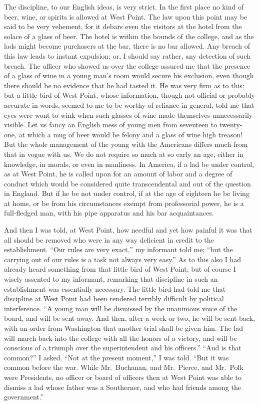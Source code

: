 The discipline, to our English ideas, is very strict.  In the first
place no kind of beer, wine, or spirits is allowed at West Point.
The law upon this point may be said to be very vehement, for it
debars even the visitors at the hotel from the solace of a glass of
beer.  The hotel is within the bounds of the college, and as the
lads might become purchasers at the bar, there is no bar allowed.
Any breach of this law leads to instant expulsion; or, I should say
rather, any detection of such breach.  The officer who showed us
over the college assured me that the presence of a glass of wine in
a young man's room would secure his exclusion, even though there
should be no evidence that he had tasted it.  He was very firm as
to this; but a little bird of West Point, whose information, though
not official or probably accurate in words, seemed to me to be
worthy of reliance in general, told me that eyes were wont to wink
when such glasses of wine made themselves unnecessarily visible.
Let us fancy an English mess of young men from seventeen to twenty-
one, at which a mug of beer would be felony and a glass of wine
high treason!  But the whole management of the young with the
Americans differs much from that in vogue with us.  We do not
require so much at so early an age, either in knowledge, in morals,
or even in manliness.  In America, if a lad be under control, as at
West Point, he is called upon for an amount of labor and a degree
of conduct which would be considered quite transcendental and out
of the question in England.  But if he be not under control, if at
the age of eighteen he be living at home, or be from his
circumstances exempt from professorial power, he is a full-fledged
man, with his pipe apparatus and his bar acquaintances.

And then I was told, at West Point, how needful and yet how painful
it was that all should be removed who were in any way deficient in
credit to the establishment.  ``Our rules are very exact,'' my
informant told me; ``but the carrying out of our rules is a task not
always very easy.''  As to this also I had already heard something
from that little bird of West Point; but of course I wisely
assented to my informant, remarking that discipline in such an
establishment was essentially necessary.  The little bird had told
me that discipline at West Point had been rendered terribly
difficult by political interference.  ``A young man will be
dismissed by the unanimous voice of the board, and will be sent
away.  And then, after a week or two, he will be sent back, with an
order from Washington that another trial shall be given him.  The
lad will march back into the college with all the honors of a
victory, and will be conscious of a triumph over the superintendent
and his officers.''  ``And is that common?'' I asked.  ``Not at the
present moment,'' I was told.  ``But it was common before the war.
While Mr.\ Buchanan, and Mr.\ Pierce, and Mr.\ Polk were Presidents,
no officer or board of officers then at West Point was able to
dismiss a lad whose father was a Southerner, and who had friends
among the government.''

